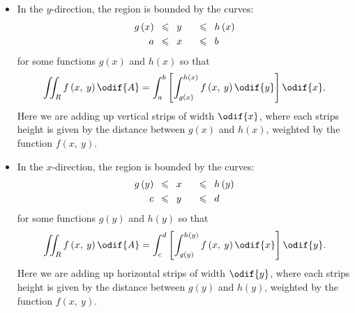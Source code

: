 \documentclass{article}
\begin{document}
\begin{itemize}
    \item In the \(y\)-direction, the region is bounded by the curves:
          \begin{alignat*}{2}
              g\left( x \right) & \hspace{0.5em} \leqslant \hspace{0.5em} y &  & \hspace{0.5em} \leqslant \hspace{0.5em} h\left( x \right) \\
              a                 & \hspace{0.5em} \leqslant \hspace{0.5em} x &  & \hspace{0.5em} \leqslant \hspace{0.5em} b
          \end{alignat*}
          for some functions \(g\left( x \right)\) and \(h\left( x \right)\)
          so that
          \begin{equation*}
              \iint_{R} f\left( x, \: y \right) \odif{A} = \int_a^b \left[ \int_{g\left( x \right)}^{h\left( x \right)} f\left( x, \: y \right) \odif{y} \right] \odif{x}.
          \end{equation*}
          Here we are adding up vertical strips of width \(\odif{x}\),
          where each strips height is given by the distance between
          \(g\left( x \right)\) and \(h\left( x \right)\), weighted by
          the function \(f\left( x, \: y \right)\).
    \item In the \(x\)-direction, the region is bounded by the curves:
          \begin{alignat*}{2}
              g\left( y \right) & \hspace{0.5em} \leqslant \hspace{0.5em} x &  & \hspace{0.5em} \leqslant \hspace{0.5em} h\left( y \right) \\
              c                 & \hspace{0.5em} \leqslant \hspace{0.5em} y &  & \hspace{0.5em} \leqslant \hspace{0.5em} d
          \end{alignat*}
          for some functions \(g\left( y \right)\) and \(h\left( y \right)\)
          so that
          \begin{equation*}
              \iint_{R} f\left( x, \: y \right) \odif{A} = \int_c^d \left[ \int_{g\left( y \right)}^{h\left( y \right)} f\left( x, \: y \right) \odif{x} \right] \odif{y}.
          \end{equation*}
          Here we are adding up horizontal strips of width \(\odif{y}\),
          where each strips height is given by the distance between
          \(g\left( y \right)\) and \(h\left( y \right)\), weighted by
          the function \(f\left( x, \: y \right)\).
\end{itemize}
\end{document}
